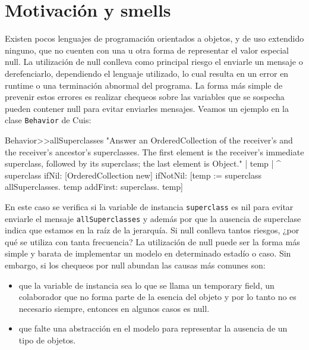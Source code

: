 \section{Motivación y smells}

Existen pocos lenguajes de programación orientados a objetos, y de uso extendido ninguno, que no
cuenten con una u otra forma de representar el valor especial null. La utilización de null conlleva
como principal riesgo el enviarle un mensaje o derefenciarlo, dependiendo el lenguaje utilizado, lo
cual resulta en un error en runtime o una terminación abnormal del programa. La forma más simple de
prevenir estos errores es realizar chequeos sobre las variables que se sospecha pueden contener null
para evitar enviarles mensajes. Veamos un ejemplo en la clase \lstinline{Behavior} de Cuis:

\begin{code}
Behavior>>allSuperclasses
	"Answer an OrderedCollection of the receiver's and the receiver's  
	ancestor's superclasses. The first element is the receiver's immediate  
	superclass, followed by its superclass; the last element is Object."
	| temp |
	^ superclass
		ifNil: [OrderedCollection new]
		ifNotNil: [temp := superclass allSuperclasses.
			temp addFirst: superclass.
            temp]
\end{code}

En este caso se verifica si la variable de instancia \lstinline{superclass} es nil para evitar
enviarle el mensaje \lstinline{allSuperclasses} y además por que la ausencia de superclase indica
que estamos en la raíz de la jerarquía.
Si null conlleva tantos riesgos, ¿por qué se utiliza con tanta frecuencia? La utilización de null
puede ser la forma más simple y barata de implementar un modelo en determinado estadío o caso. Sin
embargo, si los chequeos por null abundan las causas más comunes son:

\begin{itemize}
    \item que la variable de instancia sea lo que se llama un temporary field, un colaborador que no
    forma parte de la esencia del objeto y por lo tanto no es necesario siempre, entonces en algunos casos
    es null.
    \item que falte una abstracción en el modelo para representar la ausencia de un tipo de objetos.
\end{itemize}

